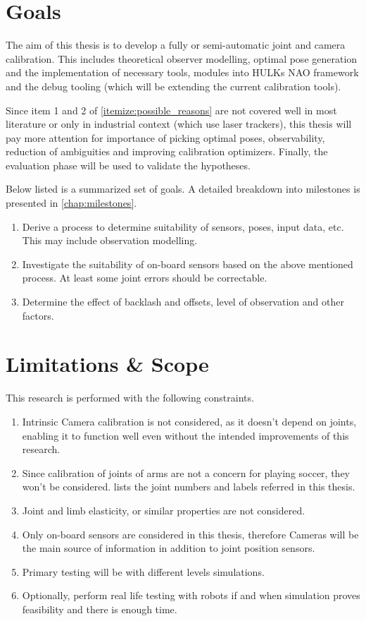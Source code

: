 \documentclass[english, printversion, nomenclature, notitle]{tuvisionthesis} %
\begin{document}
\section{Goals}

The aim of this thesis is to develop a fully or semi-automatic joint and camera calibration. This includes theoretical observer modelling, optimal  pose generation and the implementation of necessary tools, modules into HULKs NAO framework and the debug tooling (which will be extending the current calibration tools).

Since item 1 and 2 of \cref{itemize:possible_reasons} are not covered well in most literature or only in industrial context (which use laser trackers), this thesis will pay more attention for importance of picking optimal poses, observability, reduction of ambiguities and improving calibration optimizers. Finally, the evaluation phase will be used to validate the hypotheses.

Below listed is a summarized set of goals. A detailed breakdown into milestones is presented in \cref{chap:milestones}.

\begin{enumerate}
	\item Derive a process to determine suitability of sensors, poses, input data, etc. This may include observation modelling.
	\item Investigate the suitability of on-board sensors based on the above mentioned process. At least some joint errors should be correctable.
	\item Determine the effect of backlash and offsets, level of observation and other factors.
\end{enumerate}

\section{Limitations \& Scope}

This research is performed with the following constraints.

\begin{enumerate}
	\item Intrinsic Camera calibration is not considered, as it doesn't depend on joints, enabling it to function well even without the intended improvements of this research.
	\item Since calibration of joints of arms are not a concern for playing soccer, they won't be considered.  lists the joint numbers and labels referred in this thesis.
	\item Joint and limb elasticity, or similar properties are not considered.
	\item Only on-board sensors are considered in this thesis, therefore Cameras will be the main source of information in addition to joint position sensors.
	\item Primary testing will be with different levels simulations.
	\item Optionally, perform real life testing with robots if and when simulation proves feasibility and there is enough time.
\end{enumerate}
\end{document}
